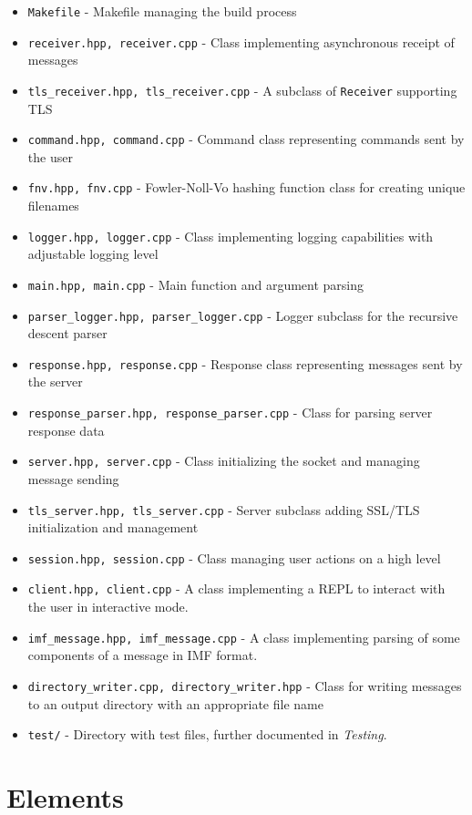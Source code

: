 \documentclass[a4]{report}
\begin{document}
\begin{itemize}
\item \texttt{Makefile} - Makefile managing the build process
\item \texttt{receiver.hpp, receiver.cpp} - Class implementing asynchronous receipt of messages
\item \texttt{tls\_receiver.hpp, tls\_receiver.cpp} - A subclass of \texttt{Receiver} supporting TLS
\item \texttt{command.hpp, command.cpp} - Command class representing commands sent by the user
\item \texttt{fnv.hpp, fnv.cpp} - Fowler-Noll-Vo\cite{eastlake-fnv-29} hashing function class for creating unique filenames
\item \texttt{logger.hpp, logger.cpp} - Class implementing logging capabilities with adjustable logging level
\item \texttt{main.hpp, main.cpp} - Main function and argument parsing
\item \texttt{parser\_logger.hpp, parser\_logger.cpp} - Logger subclass for the recursive descent parser
\item \texttt{response.hpp, response.cpp} - Response class representing messages sent by the server
\item \texttt{response\_parser.hpp, response\_parser.cpp} - Class for parsing server response data
\item \texttt{server.hpp, server.cpp} - Class initializing the socket and managing message sending
\item \texttt{tls\_server.hpp, tls\_server.cpp} - Server subclass adding SSL/TLS initialization and management
\item \texttt{session.hpp, session.cpp} - Class managing user actions on a high level
\item \texttt{client.hpp, client.cpp} - A class implementing a REPL to interact with the user in interactive mode.
\item \texttt{imf\_message.hpp, imf\_message.cpp} - A class implementing parsing of some components of a message in IMF format.
\item \texttt{directory\_writer.cpp, directory\_writer.hpp} - Class for writing messages to an output directory with an appropriate file name
\item \texttt{test/} - Directory with test files, further documented in \textit{Testing}.
\end{itemize}

\section{Elements}
\end{document}

